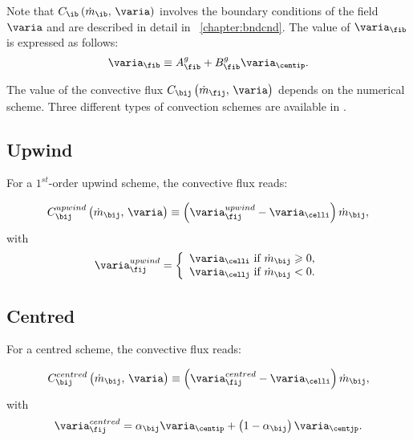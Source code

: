 Note that $C_\ib \left( \dot{m}_\ib , \, \varia \right)$ involves the boundary conditions of the field $\varia$
 and are described in detail in \chaptername~\ref{chapter:bndcnd}. The value of $\varia_{\fib}$ is expressed as follows:
\begin{equation}%
\varia_{\fib} \equiv A_{\fib}^g + B_{\fib}^g \varia_{\centip}.
\end{equation}

The value of the convective flux $ C_{\bij} \left(\dot{m}_\fij , \, \varia \right) $ depends on the numerical scheme. Three different types of convection schemes are available in \CS.

\subsection{Upwind}
For a $1^{st}$-order upwind scheme, the convective flux reads:

\begin{equation}
C_{\bij}^{upwind} \left( \dot{m}_{\bij} , \, \varia \right)  \equiv \left(\varia_{\fij}^{upwind} - \varia_{\celli} \right) \dot{m}_{\bij},
\end{equation}
with
\begin{equation}
\varia_{\fij}^{upwind} =
\left\lbrace\begin{array}{l}
\varia_\celli \text{ if } \dot{m}_{\bij}  \geqslant 0,\\
\varia_\cellj \text{ if } \dot{m}_{\bij} < 0.
\end{array}\right.
\end{equation}


\subsection{Centred}
For a centred scheme, the convective flux reads:

\begin{equation}
C_{\bij}^{centred} \left( \dot{m}_{\bij} , \, \varia \right)  \equiv \left(\varia_\fij^{centred} - \varia_{\celli} \right) \dot{m}_{\bij} ,
\end{equation}
with
\begin{equation}
\varia_\fij^{centred} = \alpha_{\bij} \varia_{\centip} + \left( 1 - \alpha_{\bij} \right) \varia_{\centjp}.
\end{equation}

